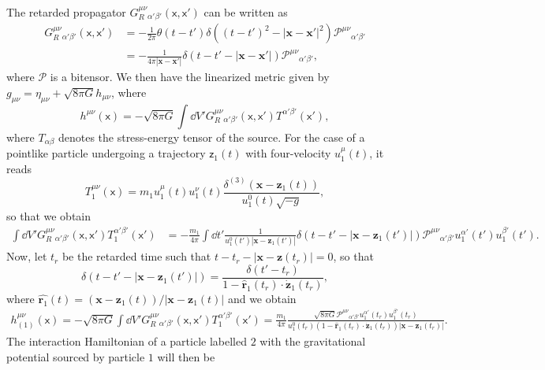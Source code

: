 \documentclass[letterpaper,12pt,titlepage,oneside,final]{book}
\newcommand{\mf}{\mathsf}%
\begin{document}
{The retarded propagator $G_R^{\mu\nu}{}_{\alpha'\beta'}(\mf x,\mf x')$ can be written as
\begin{align}
    G_R^{\mu\nu}{}_{\alpha'\beta'}(\mf x,\mf x') &= -\frac{1}{2\pi}\theta(t-t') \delta\left((t-t')^2 - |\bm x - \bm x'|^2\right)\mathcal{P}^{\mu\nu}{}_{\alpha'\beta'} \\
    &= -\frac{1}{4\pi | \bm x - \bm x'|} \delta(t-t' - |\bm x  - \bm x'|)\mathcal{P}^{\mu\nu}{}_{\alpha'\beta'},
\end{align}
where $\mathcal{P}$ is a bitensor. We then have the linearized metric given by $g_{\mu\nu} = \eta_{\mu\nu} + \sqrt{8\pi G}h_{\mu\nu}$, where
\begin{equation}
    h^{\mu\nu}(\mf x) = -\sqrt{8 \pi G}\int \dd V' G_R^{\mu\nu}{}_{\alpha' \beta'}(\mf x,\mf x') T^{\alpha' \beta'}(\mf x'),
\end{equation}
where $T_{\alpha\beta}$ denotes the stress-energy tensor of the source. For the case of a pointlike particle undergoing a trajectory $\mf z_1(t)$  with four-velocity $u_1^\mu(t)$, it reads
\begin{equation}
    T_1^{\mu\nu}(\mf x) = m_1 u_1^\mu(t) u_1^\nu(t) \frac{\delta^{(3)}(\bm x - \bm z_1(t))}{u_1^0(t) \sqrt{-g}},
\end{equation}
so that we obtain{\footnotesize
\begin{align}
    \int \dd V' G_R^{\mu\nu}{}_{\alpha'\beta'}(\mf x,\mf x')T_1^{\alpha' \beta'}(\mf x') & = -\frac{m_1}{4\pi} \int \dd t'  \frac{1}{u_1^0(t') |\bm x - \bm z_1(t')|} \delta(t-t' - |\bm x  - \bm z_1(t')|) \mathcal{P}^{\mu\nu}{}_{\alpha'\beta'}u_1^{\alpha'}(t') u_1^{\beta'}(t').
\end{align}}
Now, let $t_r$ be the retarded time such that $t - t_r - |\bm x - \bm z(t_r)| = 0$, so that
\begin{equation}
    \delta(t-t' - |\bm x  - \bm z_1(t')|) = \frac{\delta(t'-t_r)}{1- \hat{\bm r}_1(t_r)\!\cdot\! \dot{\bm z}_1(t_r)},
\end{equation}
where $\hat{\bm r_1}(t) = (\bm x  - \bm z_1(t))/|\bm x  - \bm z_1(t)|$ and we obtain
\begin{align}
    h_{(1)}^{\mu\nu}(\mf x) =- \sqrt{8 \pi G}\int \dd V' G_R^{\mu\nu}{}_{\alpha'\beta'}(\mf x,\mf x')T_1^{\alpha' \beta'}(\mf x') = \frac{ m_1}{4\pi}  \frac{\sqrt{8 \pi G}\mathcal{P}^{\mu\nu}{}_{\alpha'\beta'}u_1^{\alpha'}(t_r) u_1^{\beta'}(t_r)}{u_1^0(t_r)(1- \hat{\bm r}_1(t_r)\!\cdot\! \dot{\bm z}_1(t_r)) |\bm x - \bm z_1(t_r)|}.
\end{align}
The interaction Hamiltonian of a particle labelled $2$ with the gravitational potential sourced by particle $1$ will then be
}
\end{document}

